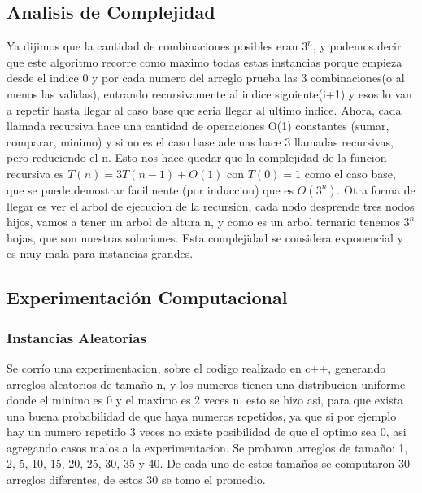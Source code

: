 \subsection*{Analisis de Complejidad}
Ya dijimos que la cantidad de combinaciones posibles eran $3^n$, y podemos decir que este algoritmo recorre como maximo todas estas instancias porque empieza desde el indice 0 y por cada numero del arreglo prueba las 3 combinaciones(o al menos las validas), entrando recursivamente al indice siguiente(i+1) y esos lo van a repetir hasta llegar al caso base que seria llegar al ultimo indice. Ahora, cada llamada recursiva hace una cantidad de operaciones O(1) constantes (sumar, comparar, minimo) y si no es el caso base ademas hace 3 llamadas recursivas, pero reduciendo el n. Esto nos hace quedar que la complejidad de la funcion recursiva es $T(n) = 3T(n-1) + O(1)$ con $T(0) = 1$ como el caso base, que se puede demostrar facilmente (por induccion) que es $O(3^n)$. Otra forma de llegar es ver el arbol de ejecucion de la recursion, cada nodo desprende tres nodos hijos, vamos a tener un arbol de altura n, y como es un arbol ternario tenemos $3^n$ hojas, que son nuestras soluciones. Esta complejidad se considera exponencial y es muy mala para instancias grandes.

\subsection*{Experimentación Computacional}
\subsubsection*{Instancias Aleatorias}
Se corrío una experimentacion, sobre el codigo realizado en c++, generando arreglos aleatorios de tamaño n, y los numeros tienen una distribucion uniforme donde el minimo es 0 y el maximo es 2 veces n, esto se hizo asi, para que exista una buena probabilidad de que haya numeros repetidos, ya que si por ejemplo hay un numero repetido 3 veces no existe posibilidad de que el optimo sea 0, asi agregando casos malos a la experimentacion. Se probaron arreglos de tamaño: 1, 2, 5, 10, 15, 20, 25, 30, 35 y 40. De cada uno de estos tamaños se computaron 30 arreglos diferentes, de estos 30 se tomo el promedio.

